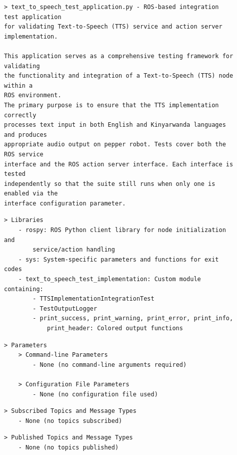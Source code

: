 \documentclass{CSSRforAfrica}
\newcommand{\checkboxChecked}{\fbox{\ding{51}}} %
\begin{document}
\begin{description}

\item[\checkboxChecked] 
{\small 
\begin{verbatim}
> text_to_speech_test_application.py - ROS-based integration test application
for validating Text-to-Speech (TTS) service and action server implementation.

This application serves as a comprehensive testing framework for validating
the functionality and integration of a Text-to-Speech (TTS) node within a
ROS environment.
The primary purpose is to ensure that the TTS implementation correctly
processes text input in both English and Kinyarwanda languages and produces
appropriate audio output on pepper robot. Tests cover both the ROS service
interface and the ROS action server interface. Each interface is tested
independently so that the suite still runs when only one is enabled via the
interface configuration parameter.
\end{verbatim}}

\item[\checkboxChecked] 
{\small 
\begin{verbatim}
> Libraries
    - rospy: ROS Python client library for node initialization and
        service/action handling
    - sys: System-specific parameters and functions for exit codes
    - text_to_speech_test_implementation: Custom module containing:
        - TTSImplementationIntegrationTest
        - TestOutputLogger
        - print_success, print_warning, print_error, print_info,
            print_header: Colored output functions
\end{verbatim}}

\item[\checkboxChecked] 
{\small 
\begin{verbatim}
> Parameters
    > Command-line Parameters
        - None (no command-line arguments required)

    > Configuration File Parameters
        - None (no configuration file used)
\end{verbatim}}

\item[\checkboxChecked] 
{\small 
\begin{verbatim}
> Subscribed Topics and Message Types
    - None (no topics subscribed)
\end{verbatim}}

\item[\checkboxChecked] 
{\small 
\begin{verbatim}                    
> Published Topics and Message Types
    - None (no topics published)
\end{verbatim}}



\end{description}
\end{document}
